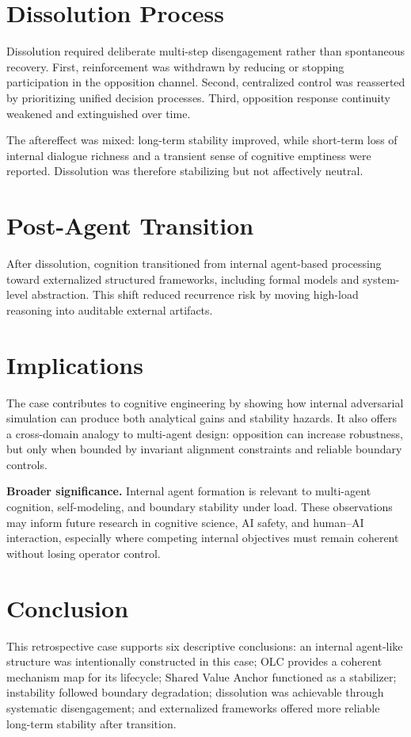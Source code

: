 \documentclass[11pt]{article}
\begin{document}
\section{Dissolution Process}
Dissolution required deliberate multi-step disengagement rather than spontaneous recovery. First, reinforcement was withdrawn by reducing or stopping participation in the opposition channel. Second, centralized control was reasserted by prioritizing unified decision processes. Third, opposition response continuity weakened and extinguished over time.

The aftereffect was mixed: long-term stability improved, while short-term loss of internal dialogue richness and a transient sense of cognitive emptiness were reported. Dissolution was therefore stabilizing but not affectively neutral.

\section{Post-Agent Transition}
After dissolution, cognition transitioned from internal agent-based processing toward externalized structured frameworks, including formal models and system-level abstraction. This shift reduced recurrence risk by moving high-load reasoning into auditable external artifacts.

\section{Implications}
The case contributes to cognitive engineering by showing how internal adversarial simulation can produce both analytical gains and stability hazards. It also offers a cross-domain analogy to multi-agent design: opposition can increase robustness, but only when bounded by invariant alignment constraints and reliable boundary controls.

\textbf{Broader significance.} Internal agent formation is relevant to multi-agent cognition, self-modeling, and boundary stability under load. These observations may inform future research in cognitive science, AI safety, and human--AI interaction, especially where competing internal objectives must remain coherent without losing operator control.

\section{Conclusion}
This retrospective case supports six descriptive conclusions: an internal agent-like structure was intentionally constructed in this case; OLC provides a coherent mechanism map for its lifecycle; Shared Value Anchor functioned as a stabilizer; instability followed boundary degradation; dissolution was achievable through systematic disengagement; and externalized frameworks offered more reliable long-term stability after transition.
\end{document}
